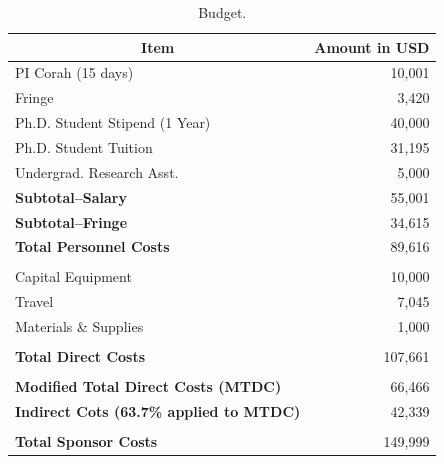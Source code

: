 
\begin{table}[!htb]
\centering
\begin{tabular}{|l|r|}
\hline
\multicolumn{1}{|c|}{Item}        & \multicolumn{1}{c|}{Amount in USD} \\ \hline
PI Corah (15 days)                & 10,001                      \\ \hline
Fringe                            & 3,420                       \\ \hline
Ph.D. Student Stipend (1 Year)
                                  & 40,000                      \\ \hline
Ph.D. Student Tuition             & 31,195                      \\ \hline
Undergrad. Research Asst.         & 5,000                       \\ \hline
\textbf{Subtotal--Salary}         & 55,001                      \\ \hline
\textbf{Subtotal--Fringe}         & 34,615                      \\ \hline
\textbf{Total Personnel Costs}    & 89,616                      \\ \hline
                                  &                             \\ \hline
Capital Equipment                 & 10,000                      \\ \hline
Travel                            & 7,045                       \\ \hline
Materials \& Supplies             & 1,000                       \\ \hline
                                  &                             \\ \hline
\textbf{Total Direct Costs}       & 107,661                     \\ \hline
                                  &                             \\ \hline
\textbf{Modified Total Direct
        Costs (MTDC)}             & 66,466                      \\ \hline
\textbf{Indirect Cots (63.7\%
        applied to MTDC)}         & 42,339                      \\ \hline
                                  &                             \\ \hline
\textbf{Total Sponsor Costs}      & 149,999                     \\ \hline
\end{tabular}
\caption{Budget.}
\label{tab:budget}
\end{table}

